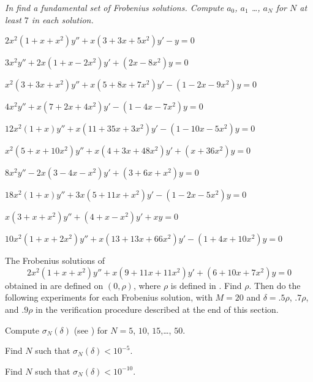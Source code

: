 \noindent
\emph{In  find a fundamental
set
of Frobenius solutions. Compute $a_0$, $a_{1}$ \dots, $a_N$ for $N$ at
least
$7$ in
each solution.}
\begin{exerciselist}

\item\label{exer:7.5.1}\Cex $2x^2(1+x+x^2)y''+x(3+3x+5x^2)y'-y=0$

\item\label{exer:7.5.2}\Cex $3x^2y''+2x(1+x-2x^2)y'+(2x-8x^2)y=0$

\item\label{exer:7.5.3}\Cex $x^2(3+3x+x^2)y''+x(5+8x+7x^2)y'-(1-2x-9x^2)y=0$

\item\label{exer:7.5.4}\Cex $4x^2y''+x(7+2x+4x^2)y'-(1-4x-7x^2)y=0$

\item\label{exer:7.5.5}\Cex $12x^2(1+x)y''+x(11+35x+3x^2)y'-(1-10x-5x^2)y=0$

\item\label{exer:7.5.6}\Cex $x^2(5+x+10x^2)y''+x(4+3x+48x^2)y'+(x+36x^2)y=0$

\item\label{exer:7.5.7}\Cex $8x^2y''-2x(3-4x-x^2)y'+(3+6x+x^2)y=0$

\item\label{exer:7.5.8}\Cex
$18x^2(1+x)y''+3x(5+11x+x^2)y'-(1-2x-5x^2)y=0$

\item\label{exer:7.5.9}\Cex $x(3+x+x^2)y''+(4+x-x^2)y'+xy=0$

\item\label{exer:7.5.10}\Cex
$10x^2(1+x+2x^2)y''+x(13+13x+66x^2)y'-(1+4x+10x^2)y=0$


\item\label{exer:7.5.11}\Lex
The Frobenius solutions of
\[
2x^2(1+x+x^2)y''+x(9+11x+11x^2)y'+(6+10x+7x^2)y=0
\]
obtained in  are defined on $(0,\rho)$,
where $\rho$ is defined in . Find $\rho$.
Then do the following experiments for each Frobenius solution,
with $M=20$ and $\delta=.5\rho$, $.7\rho$, and $.9\rho$
in the verification procedure described at the end of this section.
\begin{alist}
\item %
Compute  $\sigma_N(\delta)$  (see )
for $N=5$, $10$, $15$,\dots, $50$.
\item %
Find $N$ such that $\sigma_N(\delta)<10^{-5}$.
\item %
Find $N$ such that $\sigma_N(\delta)<10^{-10}$.
\end{alist}



\end{exerciselist}
